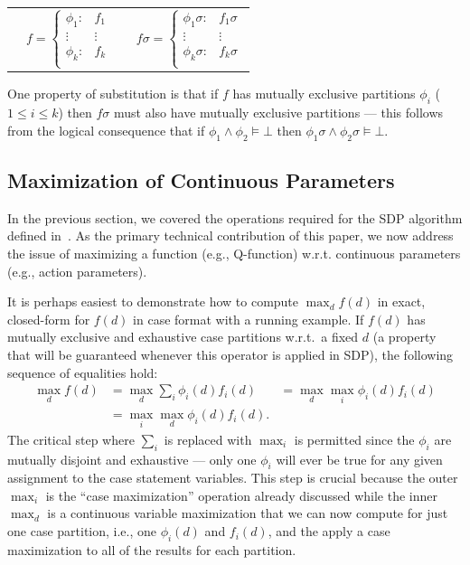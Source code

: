 \documentclass[letterpaper]{article}
\begin{document}
{\footnotesize
\begin{center}
\begin{tabular}{r c c l}
&
\hspace{-6mm} 
  $f = \begin{cases}
    \phi_1: & f_1 \\ 
   \vdots&\vdots\\ 
    \phi_k: & f_k \\ 
  \end{cases}$
&

&
\hspace{-2mm}
  $f\sigma = \begin{cases}
    \phi_1\sigma: & f_1\sigma \\ 
   \vdots&\vdots\\ 
    \phi_k\sigma: & f_k\sigma \\ 
  \end{cases}$
\end{tabular}
\end{center}
}
\normalsize

One property of substitution is that
if $f$ has mutually exclusive partitions $\phi_i$ ($1 \leq i \leq k$)
then $f\sigma$ must also have mutually exclusive partitions ---
this follows from the logical consequence that 
if $\phi_1 \land \phi_2 \models \bot$
then $\phi_1\sigma \land \phi_2\sigma \models \bot$.

\subsection{Maximization of Continuous Parameters}

In the previous section, we covered the operations required for the
SDP algorithm defined in~\cite{sanner_uai11}.  As the primary
technical contribution of this paper, we now address the
issue of maximizing a function (e.g., Q-function) w.r.t. continuous
parameters (e.g., action parameters).

It is perhaps easiest to demonstrate how to compute $\max_d f(d)$ in exact,
closed-form for $f(d)$ in case format with a running example.
If $f(d)$ has mutually exclusive and exhaustive 
case partitions w.r.t.\ a fixed $d$ (a property that will be guaranteed 
whenever this operator is applied in SDP), the following sequence of
equalities hold:
\begin{align*}
\max_d f(d) & = \max_d \sum_i \phi_i(d) f_i(d) & = \max_d \max_i \phi_i(d) f_i(d)\\
            & = \max_i \max_d \phi_i(d) f_i(d).
\end{align*}
The critical step where $\sum_i$ is replaced with $\max_i$ is permitted
since the $\phi_i$ are mutually disjoint and exhaustive --- only one $\phi_i$
will ever be true for any given assignment to the case statement variables.
This step is crucial because the outer $\max_i$ is the ``case maximization''
operation already discussed while the inner $\max_d$ is a continuous variable
maximization that we can now compute for just one case partition, i.e.,
one $\phi_i(d)$ and $f_i(d)$, and the apply a case maximization to all
of the results for each partition.
\end{document}
